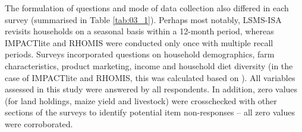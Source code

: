 The formulation of questions and mode of data collection also differed in each survey (summarised in Table \ref{tab:03_1}). Perhaps most notably, LSMS-ISA revisits households on a seasonal basis within a 12-month period, whereas IMPACTlite and RHOMIS were conducted only once with multiple recall periods. Surveys incorporated questions on household demographics, farm characteristics, product marketing, income and household diet diversity (in the case of IMPACTlite and RHOMIS, this was calculated based on \citealp{Swindale2006}). All variables assessed in this study were answered by all respondents. In addition, zero values (for land holdings, maize yield and livestock) were crosschecked with other sections of the surveys to identify potential item non-responses -- all zero values were corroborated.



